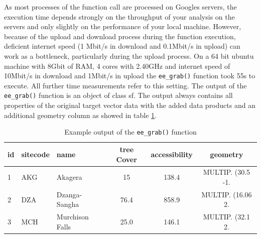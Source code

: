 As most processes of the function call are processed on Googles servers, the execution time depends strongly on the throughput of your analysis on the servers and only slightly on the performance of your local machine. However, because of the upload and download process during the function execution, deficient internet speed (1 Mbit/s in download and 0.1Mbit/s in upload) can work as a bottleneck, particularly during the upload process. 
On a 64 bit ubuntu machine with 8Gbit of RAM, 4 cores with 2.40GHz and internet speed of 10Mbit/s in download and 1Mbit/s in upload the \texttt{ee\_grab()} function took 55s to execute. All further time measurements refer to this setting.
The output of the \texttt{ee\_grab()} function is an object of class sf.  The output always contains all properties of the original target vector data with the added data products and an additional geometry column as showed in table \ref{output}.

\begin{table}[h]
	\begin{tabularx}{\textwidth}{|l|l|l|c|c|c|}
		\hline
		id & sitecode & name & tree Cover & accessibility & geometry \\
		\hline
		1  & AKG  & Akagera & 15 & 138.4 & MULTIP. (30.5 -1.\\
		2 & DZA  & Dzanga-Sangha & 76.4 & 858.9 & MULTIP. (16.06 2.\\
		3 & MCH  & Murchison Falls & 25.0 & 146.1 & MULTIP. (32.1 2.\\
		
		\hline
	\end{tabularx}
	\caption{Example output of the \texttt{ee\_grab()} function}
	\label{output}
\end{table}


